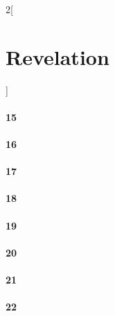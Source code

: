 \documentclass{book}
\begin{document}
\begin{multicols}{2}[\part{Revelation}]
\subsection*{15}
\subsection*{16}
\subsection*{17}
\subsection*{18}
\subsection*{19}
\subsection*{20}
\subsection*{21}
\subsection*{22}
\end{multicols}
\end{document}
